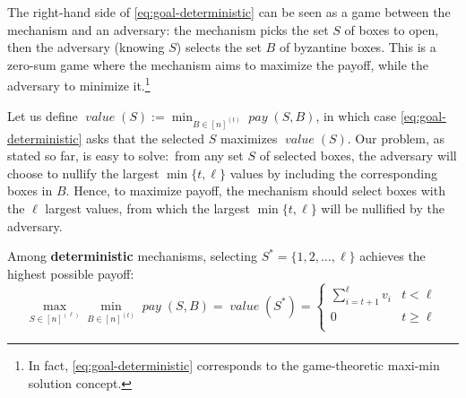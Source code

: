 \documentclass[sigconf,nonacm]{aamas}
\DeclareMathOperator{\payText}{\textit{pay}}
\newcommand{\pay}[1]{\payText({#1})}
\DeclareMathOperator{\valueText}{\textit{value}}
\newcommand{\val}[1]{\valueText({#1})}
\begin{document}
The right-hand side of \cref{eq:goal-deterministic} can be seen as a game between the mechanism and an adversary: the mechanism picks the set $S$ of boxes to open, then the adversary (knowing $S$) selects the set $B$ of byzantine boxes. This is a zero-sum game where the mechanism aims to maximize the payoff, while the adversary to minimize it.\footnote{In fact, \cref{eq:goal-deterministic} corresponds to the game-theoretic maxi-min solution concept.} 

Let us define $\val{S}:= \min_{B \in [n]^{(t)}}\pay{S, B}$, in which case \cref{eq:goal-deterministic} asks that the selected $S$ maximizes $\val{S}$. Our problem, as stated so far, is easy to solve:~from any set $S$ of selected boxes, the adversary will choose to nullify the largest $\min\{t, \ell\}$ values by including the corresponding boxes in $B.$ Hence, to maximize payoff, the mechanism should select boxes with the $\ell$ largest values, from which the largest $\min\{t, \ell\}$ will be nullified by the adversary. 

\begin{theorem} Among \textbf{deterministic} mechanisms, selecting $S^* = \{1, 2, \dots, \ell\}$ achieves the highest possible payoff:%
%
\begin{equation*}
    \max_{S \in [n]^{(\ell)}} \min_{B \in [n]^{(t)}}\pay{S, B} = 
    \val{S^*} = \left\{
\begin{array}{ll}
      \sum_{i = t + 1}^{\ell}v_i & t < \ell\\
      0 & t \geq \ell\\
\end{array} 
\right.
\end{equation*}
\end{theorem}
\end{document}

